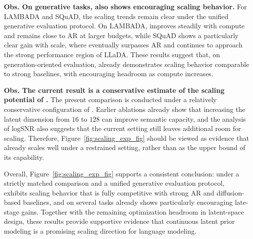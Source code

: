 \textbf{Obs.  On generative tasks, \method also shows encouraging scaling behavior.}
For LAMBADA and SQuAD, the scaling trends remain clear under the unified generative evaluation protocol. On LAMBADA, \method improves steadily with compute and remains close to AR at larger budgets, while SQuAD shows a particularly clear gain with scale, where \method eventually surpasses AR and continues to approach the strong performance region of LLaDA. These results suggest that, on generation-oriented evaluation, \method already demonstrates scaling behavior comparable to strong baselines, with encouraging headroom as compute increases.

\textbf{Obs.  The current result is a conservative estimate of the scaling potential of \method.}
The present comparison is conducted under a relatively conservative configuration of \method. Earlier ablations already show that increasing the latent dimension from $16$ to $128$ can improve semantic capacity, and the analysis of logSNR also suggests that the current setting still leaves additional room for scaling. Therefore, Figure~\ref{fig:scaling_exp_fig} should be viewed as evidence that \method already scales well under a restrained setting, rather than as the upper bound of its capability.

Overall, Figure~\ref{fig:scaling_exp_fig} supports a consistent conclusion: under a strictly matched comparison and a unified generative evaluation protocol, \method exhibits scaling behavior that is fully competitive with strong AR and diffusion-based baselines, and on several tasks already shows particularly encouraging late-stage gains. Together with the remaining optimization headroom in latent-space design, these results provide supportive evidence that continuous latent prior modeling is a promising scaling direction for language modeling.

